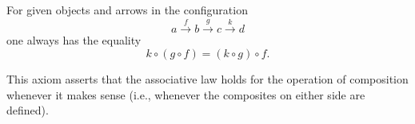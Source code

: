 For given objects and arrows in the configuration
$$a \xrightarrow{f} b \xrightarrow{g} c \xrightarrow{k} d$$
one always has the equality
$$k \circ (g \circ f) = (k \circ g) \circ f.$$

This axiom asserts that the associative law holds for the operation of composition whenever it makes sense (i.e., whenever the composites on either side are defined).
